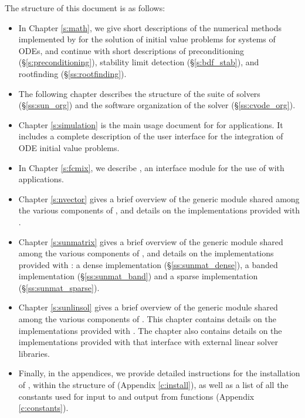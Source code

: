 The structure of this document is as follows:
\begin{itemize}
\item
  In Chapter \ref{s:math}, we give short descriptions of the numerical
  methods implemented by {\cvode} for the solution of initial value
  problems for systems of ODEs, and continue with short descriptions of
  preconditioning (\S\ref{s:preconditioning}), stability limit detection
  (\S\ref{s:bdf_stab}), and rootfinding (\S\ref{ss:rootfinding}).
\item
  The following chapter describes the structure of the {\sundials} suite
  of solvers (\S\ref{ss:sun_org}) and the software organization of the {\cvode}
  solver (\S\ref{ss:cvode_org}). 
\item
  Chapter \ref{s:simulation} is the main usage document for {\cvode} for
  {\CC} applications.  It includes a complete description of the user interface
  for the integration of ODE initial value problems.
\item
  In Chapter \ref{s:fcmix}, we describe {\fcvode}, an interface module
  for the use of {\cvode} with {\F} applications.
\item
  Chapter \ref{s:nvector} gives a brief overview of the generic
  {\nvector} module shared among the various components of
  {\sundials}, and details on the {\nvector} implementations
  provided with {\sundials}.
\item
  Chapter \ref{s:sunmatrix} gives a brief overview of the generic
  {\sunmatrix} module shared among the various components of
  {\sundials}, and details on the {\sunmatrix} implementations
  provided with {\sundials}: 
  a dense implementation (\S\ref{ss:sunmat_dense}),
  a banded implementation (\S\ref{ss:sunmat_band}) and
  a sparse implementation (\S\ref{ss:sunmat_sparse}).
\item
  Chapter \ref{s:sunlinsol} gives a brief overview of the generic
  {\sunlinsol} module shared among the various components of
  {\sundials}.  This chapter contains details on the {\sunlinsol}
  implementations provided with {\sundials}.
  The chapter
  also contains details on the {\sunlinsol} implementations provided
  with {\sundials} that interface with external linear solver
  libraries.
\item
  Finally, in the appendices, we provide detailed instructions for the installation
  of {\cvode}, within the structure of {\sundials} (Appendix \ref{c:install}), as well
  as a list of all the constants used for input to and output from {\cvode} functions
  (Appendix \ref{c:constants}).
\end{itemize}

